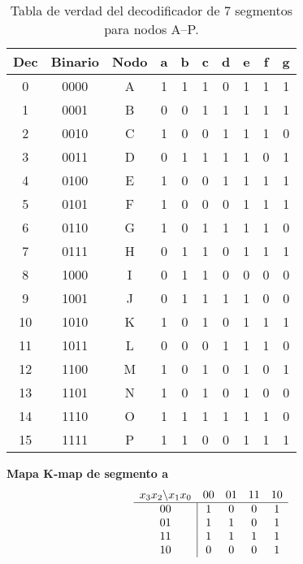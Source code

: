 \documentclass[12pt]{article}
\begin{document}

\begin{table}[h!]
\centering
\begin{tabular}{|c|c|c||c|c|c|c|c|c|c|}
\hline
\textbf{Dec} & \textbf{Binario} & \textbf{Nodo} 
  & \textbf{a} & \textbf{b} & \textbf{c} & \textbf{d} & \textbf{e} & \textbf{f} & \textbf{g} \\
\hline
0  & 0000 & A & 1 & 1 & 1 & 0 & 1 & 1 & 1 \\  
1  & 0001 & B & 0 & 0 & 1 & 1 & 1 & 1 & 1 \\  
2  & 0010 & C & 1 & 0 & 0 & 1 & 1 & 1 & 0 \\  
3  & 0011 & D & 0 & 1 & 1 & 1 & 1 & 0 & 1 \\  
4  & 0100 & E & 1 & 0 & 0 & 1 & 1 & 1 & 1 \\  
5  & 0101 & F & 1 & 0 & 0 & 0 & 1 & 1 & 1 \\  
6  & 0110 & G & 1 & 0 & 1 & 1 & 1 & 1 & 0 \\  
7  & 0111 & H & 0 & 1 & 1 & 0 & 1 & 1 & 1 \\  
8  & 1000 & I & 0 & 1 & 1 & 0 & 0 & 0 & 0 \\  
9  & 1001 & J & 0 & 1 & 1 & 1 & 1 & 0 & 0 \\  
10 & 1010 & K & 1 & 0 & 1 & 0 & 1 & 1 & 1 \\  
11 & 1011 & L & 0 & 0 & 0 & 1 & 1 & 1 & 0 \\  
12 & 1100 & M & 1 & 0 & 1 & 0 & 1 & 0 & 1 \\  
13 & 1101 & N & 1 & 0 & 1 & 0 & 1 & 0 & 0 \\  
14 & 1110 & O & 1 & 1 & 1 & 1 & 1 & 1 & 0 \\  
15 & 1111 & P & 1 & 1 & 0 & 0 & 1 & 1 & 1 \\  
\hline
\end{tabular}
\caption{Tabla de verdad del decodificador de 7 segmentos para nodos A–P.}
\label{tab:7seg_decoder}
\end{table}

\bigskip

\noindent
\textbf{Mapa K‐map de segmento \textsf{a}}  
\[
\begin{array}{c|cccc}
\multicolumn{1}{c}{x_3x_2 \backslash x_1x_0} & 00 & 01 & 11 & 10 \\
\hline
00 & 1 & 0 & 0 & 1 \\
01 & 1 & 1 & 0 & 1 \\
11 & 1 & 1 & 1 & 1 \\
10 & 0 & 0 & 0 & 1 \\
\end{array}
\]
\vspace{1em}
\end{document}
